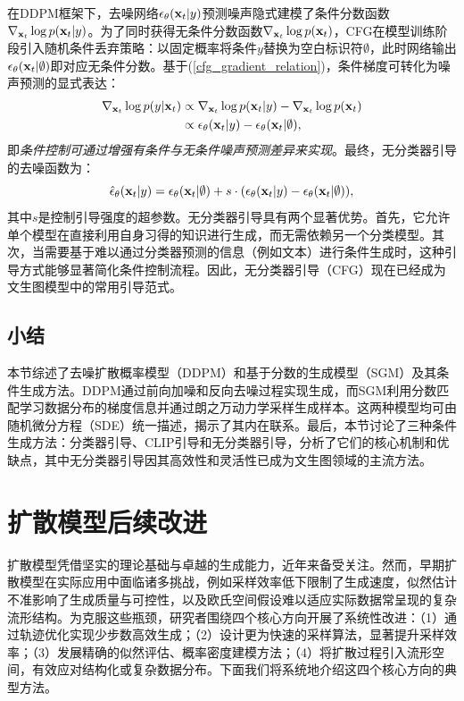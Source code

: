 \documentclass[11pt,a4paper,UTF8]{ctexart}
\begin{document}
在DDPM框架下，去噪网络$\epsilon_\theta(\mathbf{x}_t|y)$预测噪声隐式建模了条件分数函数$\nabla_{\mathbf{x}_t}\log p(\mathbf{x}_t|y)$。为了同时获得无条件分数函数$\nabla_{\mathbf{x}_t}\log p(\mathbf{x}_t)$，CFG在模型训练阶段引入随机条件丢弃策略：以固定概率将条件$y$替换为空白标识符$\emptyset$，此时网络输出$\epsilon_\theta(\mathbf{x}_t|\emptyset)$即对应无条件分数。基于(\ref{cfg_gradient_relation})，条件梯度可转化为噪声预测的显式表达：
\begin{align*}
    \nabla_{\mathbf{x}_t}\log p(y|\mathbf{x}_t) & \propto \nabla_{\mathbf{x}_t}\log p(\mathbf{x}_t|y) -\nabla_{\mathbf{x}_t}\log p(\mathbf{x}_t) \\
    &\propto \epsilon_\theta(\mathbf{x}_t|y) - \epsilon_\theta(\mathbf{x}_t|\emptyset),
\end{align*}
即\emph{条件控制可通过增强有条件与无条件噪声预测差异来实现}。最终，无分类器引导的去噪函数为：
\begin{equation}
    \hat{\epsilon}_\theta(\mathbf{x}_t|y) = \epsilon_\theta(\mathbf{x}_t|\emptyset) + s\cdot(\epsilon_\theta(\mathbf{x}_t|y) - \epsilon_\theta(\mathbf{x}_t|\emptyset)),
\label{conditional_classifier_free_guided}
\end{equation}
其中$s$是控制引导强度的超参数。无分类器引导具有两个显著优势。首先，它允许单个模型在直接利用自身习得的知识进行生成，而无需依赖另一个分类模型。其次，当需要基于难以通过分类器预测的信息（例如文本）进行条件生成时，这种引导方式能够显著简化条件控制流程。因此，无分类器引导（CFG）现在已经成为文生图模型中的常用引导范式。

\subsection{小结}

本节综述了去噪扩散概率模型（DDPM）和基于分数的生成模型（SGM）及其条件生成方法。DDPM通过前向加噪和反向去噪过程实现生成，而SGM利用分数匹配学习数据分布的梯度信息并通过朗之万动力学采样生成样本。这两种模型均可由随机微分方程（SDE）统一描述，揭示了其内在联系。最后，本节讨论了三种条件生成方法：分类器引导、CLIP引导和无分类器引导，分析了它们的核心机制和优缺点，其中无分类器引导因其高效性和灵活性已成为文生图领域的主流方法。


\newpage

\section{扩散模型后续改进}

扩散模型凭借坚实的理论基础与卓越的生成能力，近年来备受关注。然而，早期扩散模型在实际应用中面临诸多挑战，例如采样效率低下限制了生成速度，似然估计不准影响了生成质量与可控性，以及欧氏空间假设难以适应实际数据常呈现的复杂流形结构。为克服这些瓶颈，研究者围绕四个核心方向开展了系统性改进：（1）通过轨迹优化实现少步数高效生成；（2）设计更为快速的采样算法，显著提升采样效率；（3）发展精确的似然评估、概率密度建模方法；（4）将扩散过程引入流形空间，有效应对结构化或复杂数据分布。下面我们将系统地介绍这四个核心方向的典型方法。
\end{document}
